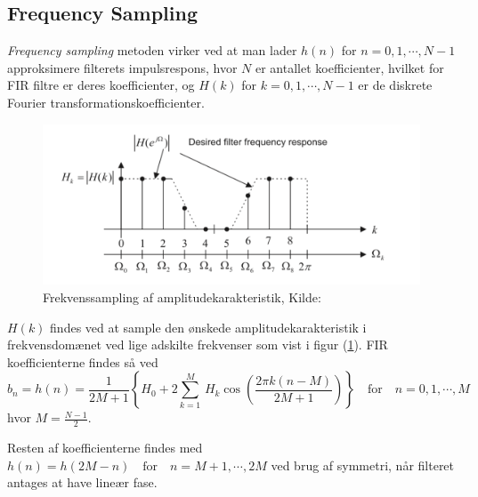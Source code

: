 \subsection{Frequency Sampling}
\textit{Frequency sampling} metoden virker ved at man lader $h(n)$ for $n = 0, 1, \cdots, N - 1$ approksimere filterets impulsrespons, hvor $N$ er antallet koefficienter, hvilket for FIR filtre er deres koefficienter, og $H(k)$ for $k = 0, 1, \cdots, N - 1$ er de diskrete Fourier transformationskoefficienter.
\begin{figure}[!ht]
	\includegraphics[width=\textwidth]{billeder/frequencysampling.png}
	\caption{Frekvenssampling af amplitudekarakteristik, Kilde:\cite{Tan2013}}
	\label{fig:frequencysampling}
\end{figure}
$H(k)$ findes ved at sample den ønskede amplitudekarakteristik i frekvensdomænet ved lige adskilte frekvenser som vist i figur (\ref{fig:frequencysampling}).\newline
FIR koefficienterne findes så ved
\begin{equation} \label{eq:fir_koefficienter}
b_n = h(n) = \frac{1}{2M + 1} \left\{H_0 + 2\displaystyle\sum_{k = 1}^{M}\, H_k\cos\left(\frac{2\pi k (n - M)}{2M + 1} \right) \right\} \quad \mathrm{for} \quad n = 0, 1, \cdots, M
\end{equation}
hvor $M = \frac{N - 1}{2}$.

Resten af koefficienterne findes med $h(n) = h(2M - n) \quad \mathrm{for} \quad n = M + 1, \cdots, 2M$ ved brug af symmetri, når filteret antages at have lineær fase\cite[p. 263]{Tan2013}.



